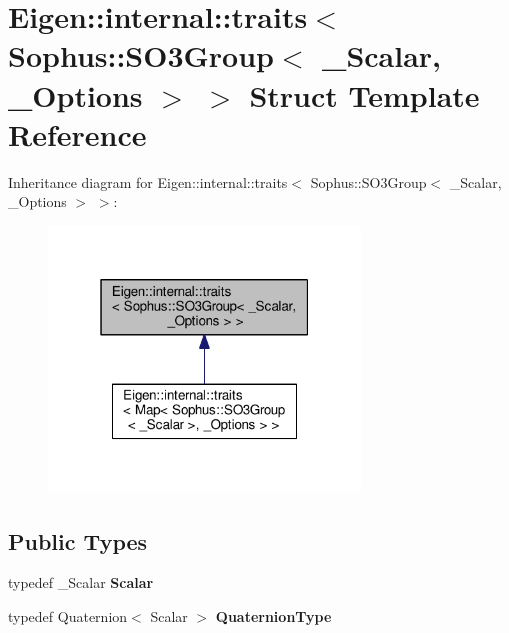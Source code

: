 \hypertarget{struct_eigen_1_1internal_1_1traits_3_01_sophus_1_1_s_o3_group_3_01___scalar_00_01___options_01_4_01_4}{}\section{Eigen\+:\+:internal\+:\+:traits$<$ Sophus\+:\+:S\+O3\+Group$<$ \+\_\+\+Scalar, \+\_\+\+Options $>$ $>$ Struct Template Reference}
\label{struct_eigen_1_1internal_1_1traits_3_01_sophus_1_1_s_o3_group_3_01___scalar_00_01___options_01_4_01_4}


Inheritance diagram for Eigen\+:\+:internal\+:\+:traits$<$ Sophus\+:\+:S\+O3\+Group$<$ \+\_\+\+Scalar, \+\_\+\+Options $>$ $>$\+:
\nopagebreak
\begin{figure}[H]
\begin{center}
\leavevmode
\includegraphics[width=235pt]{struct_eigen_1_1internal_1_1traits_3_01_sophus_1_1_s_o3_group_3_01___scalar_00_01___options_01_4_01_4__inherit__graph}
\end{center}
\end{figure}
\subsection*{Public Types}
\begin{DoxyCompactItemize}
\item 
typedef \+\_\+\+Scalar {\bfseries Scalar}\hypertarget{struct_eigen_1_1internal_1_1traits_3_01_sophus_1_1_s_o3_group_3_01___scalar_00_01___options_01_4_01_4_a474f07e710c0e41889b61c06447e2aac}{}\label{struct_eigen_1_1internal_1_1traits_3_01_sophus_1_1_s_o3_group_3_01___scalar_00_01___options_01_4_01_4_a474f07e710c0e41889b61c06447e2aac}

\item 
typedef Quaternion$<$ Scalar $>$ {\bfseries Quaternion\+Type}\hypertarget{struct_eigen_1_1internal_1_1traits_3_01_sophus_1_1_s_o3_group_3_01___scalar_00_01___options_01_4_01_4_ab85eb0f122badc3f37807365c822e11c}{}\label{struct_eigen_1_1internal_1_1traits_3_01_sophus_1_1_s_o3_group_3_01___scalar_00_01___options_01_4_01_4_ab85eb0f122badc3f37807365c822e11c}

\end{DoxyCompactItemize}


